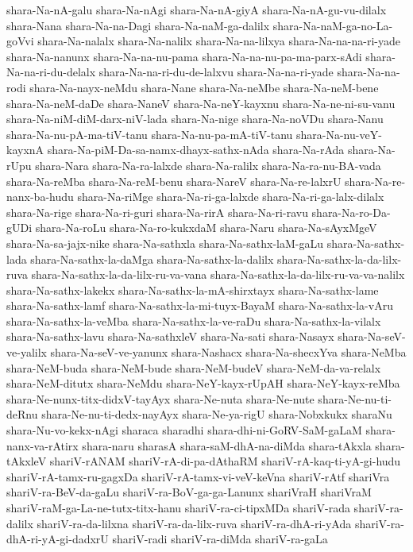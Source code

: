 {shara-Na-nA-galu
shara-Na-nAgi
shara-Na-nA-giyA
shara-Na-nA-gu-vu-dilalx
shara-Nana
shara-Na-na-Dagi
shara-Na-naM-ga-dalilx
shara-Na-naM-ga-no-La-goVvi
shara-Na-nalalx
shara-Na-nalilx
shara-Na-na-lilxya
shara-Na-na-na-ri-yade
shara-Na-nanunx
shara-Na-na-nu-pama
shara-Na-na-nu-pa-ma-parx-sAdi
shara-Na-na-ri-du-delalx
shara-Na-na-ri-du-de-lalxvu
shara-Na-na-ri-yade
shara-Na-na-rodi
shara-Na-nayx-neMdu
shara-Nane
shara-Na-neMbe
shara-Na-neM-bene
shara-Na-neM-daDe
shara-NaneV
shara-Na-neY-kayxnu
shara-Na-ne-ni-su-vanu
shara-Na-niM-diM-darx-niV-lada
shara-Na-nige
shara-Na-noVDu
shara-Nanu
shara-Na-nu-pA-ma-tiV-tanu
shara-Na-nu-pa-mA-tiV-tanu
shara-Na-nu-veY-kayxnA
shara-Na-piM-Da-sa-namx-dhayx-sathx-nAda
shara-Na-rAda
shara-Na-rUpu
shara-Nara
shara-Na-ra-lalxde
shara-Na-ralilx
shara-Na-ra-nu-BA-vada
shara-Na-reMba
shara-Na-reM-benu
shara-NareV
shara-Na-re-lalxrU
shara-Na-re-nanx-ba-hudu
shara-Na-riMge
shara-Na-ri-ga-lalxde
shara-Na-ri-ga-lalx-dilalx
shara-Na-rige
shara-Na-ri-guri
shara-Na-rirA
shara-Na-ri-ravu
shara-Na-ro-Da-gUDi
shara-Na-roLu
shara-Na-ro-kukxdaM
shara-Naru
shara-Na-sAyxMgeV
shara-Na-sa-jajx-nike
shara-Na-sathxla
shara-Na-sathx-laM-gaLu
shara-Na-sathx-lada
shara-Na-sathx-la-daMga
shara-Na-sathx-la-dalilx
shara-Na-sathx-la-da-lilx-ruva
shara-Na-sathx-la-da-lilx-ru-va-vana
shara-Na-sathx-la-da-lilx-ru-va-va-nalilx
shara-Na-sathx-lakekx
shara-Na-sathx-la-mA-shirxtayx
shara-Na-sathx-lame
shara-Na-sathx-lamf
shara-Na-sathx-la-mi-tuyx-BayaM
shara-Na-sathx-la-vAru
shara-Na-sathx-la-veMba
shara-Na-sathx-la-ve-raDu
shara-Na-sathx-la-vilalx
shara-Na-sathx-lavu
shara-Na-sathxleV
shara-Na-sati
shara-Nasayx
shara-Na-seV-ve-yalilx
shara-Na-seV-ve-yanunx
shara-Nashacx
shara-Na-shecxYva
shara-NeMba
shara-NeM-buda
shara-NeM-bude
shara-NeM-budeV
shara-NeM-da-va-relalx
shara-NeM-ditutx
shara-NeMdu
shara-NeY-kayx-rUpAH
shara-NeY-kayx-reMba
shara-Ne-nunx-titx-didxV-tayAyx
shara-Ne-nuta
shara-Ne-nute
shara-Ne-nu-ti-deRnu
shara-Ne-nu-ti-dedx-nayAyx
shara-Ne-ya-rigU
shara-Nobxkukx
sharaNu
shara-Nu-vo-kekx-nAgi
sharaca
sharadhi
shara-dhi-ni-GoRV-SaM-gaLaM
shara-nanx-va-rAtirx
shara-naru
sharasA
shara-saM-dhA-na-diMda
shara-tAkxla
shara-tAkxleV
shariV-rANAM
shariV-rA-di-pa-dAthaRM
shariV-rA-kaq-ti-yA-gi-hudu
shariV-rA-tamx-ru-gagxDa
shariV-rA-tamx-vi-veV-keVna
shariV-rAtf
shariVra
shariV-ra-BeV-da-gaLu
shariV-ra-BoV-ga-ga-Lanunx
shariVraH
shariVraM
shariV-raM-ga-La-ne-tutx-titx-hanu
shariV-ra-ci-tipxMDa
shariV-rada
shariV-ra-dalilx
shariV-ra-da-lilxna
shariV-ra-da-lilx-ruva
shariV-ra-dhA-ri-yAda
shariV-ra-dhA-ri-yA-gi-dadxrU
shariV-radi
shariV-ra-diMda
shariV-ra-gaLa
}
